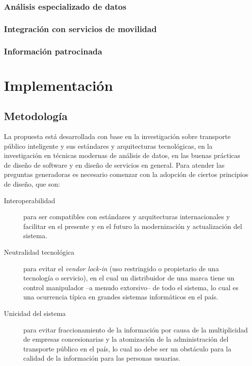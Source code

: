 \documentclass{report}
\begin{document}
\subsection{Análisis especializado de datos}

\subsection{Integración con servicios de movilidad}

\subsection{Información patrocinada}

\chapter{Implementación}

\section{Metodología}

La propuesta está desarrollada con base en la investigación sobre transporte público inteligente y sus estándares y arquitecturas tecnológicas, en la investigación en técnicas modernas de análisis de datos, en las buenas prácticas de diseño de software y en diseño de servicios en general. Para atender las preguntas generadoras es necesario comenzar con la adopción de ciertos principios de diseño, que son:

\begin{description}
    \item[Interoperabilidad] para ser compatibles con estándares y arquitecturas internacionales \cite{davies2019state} y facilitar en el presente y en el futuro la modernización y actualización del sistema.
    \item[Neutralidad tecnológica] para evitar el \textit{vendor lock-in} (uso restringido o propietario de una tecnología o servicio), en el cual un distribuidor de una marca tiene un control manipulador –a menudo extorsivo– de todo el sistema, lo cual es una ocurrencia típica en grandes sistemas informáticos en el país.
    \item[Unicidad del sistema] para evitar fraccionamiento de la información por causa de la multiplicidad de empresas concesionarias y la atomización de la administración del transporte público en el país, lo cual no debe ser un obstáculo para la calidad de la información para las personas usuarias.
\end{description}
\end{document}
